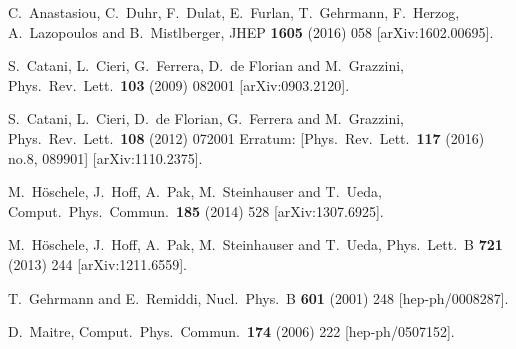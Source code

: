 \documentclass[12pt]{article}
\begin{document}
\begin{thebibliography}{99}
  C.~Anastasiou, C.~Duhr, F.~Dulat, E.~Furlan, T.~Gehrmann, F.~Herzog, A.~Lazopoulos and B.~Mistlberger,
  JHEP {\bf 1605} (2016) 058
   [arXiv:1602.00695].

  
  
  
  S.~Catani, L.~Cieri, G.~Ferrera, D.~de Florian and M.~Grazzini,
  Phys.\ Rev.\ Lett.\  {\bf 103} (2009) 082001
  [arXiv:0903.2120].

  S.~Catani, L.~Cieri, D.~de Florian, G.~Ferrera and M.~Grazzini,
  Phys.\ Rev.\ Lett.\  {\bf 108} (2012) 072001
   Erratum: [Phys.\ Rev.\ Lett.\  {\bf 117} (2016) no.8,  089901]
  [arXiv:1110.2375].





  M.~H\"oschele, J.~Hoff, A.~Pak, M.~Steinhauser and T.~Ueda,
  Comput.\ Phys.\ Commun.\  {\bf 185} (2014) 528
  [arXiv:1307.6925].
  
  M.~H\"oschele, J.~Hoff, A.~Pak, M.~Steinhauser and T.~Ueda,
  Phys.\ Lett.\ B {\bf 721} (2013) 244
  [arXiv:1211.6559].
  
  T.~Gehrmann and E.~Remiddi,
  Nucl.\ Phys.\ B {\bf 601} (2001) 248
   [hep-ph/0008287].

  
  D.~Maitre,
  Comput.\ Phys.\ Commun.\  {\bf 174} (2006) 222
   [hep-ph/0507152].
  

\end{thebibliography}
\end{document}

